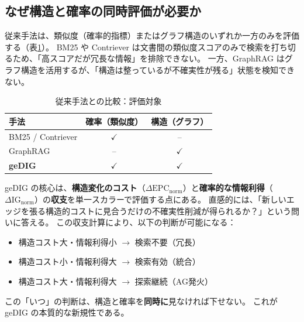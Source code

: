 \documentclass[ja=standard,xelatex]{bxjsarticle}
\newcommand{\gednorm}{\Delta\mathrm{EPC}_{\mathrm{norm}}}
\newcommand{\ignorm}{\Delta\mathrm{IG}_{\mathrm{norm}}}
\begin{document}
\subsection{なぜ構造と確率の同時評価が必要か}\label{sec:why_both}
従来手法は、類似度（確率的指標）またはグラフ構造のいずれか一方のみを評価する（表\ref{tab:structure_probability_comparison}）。
BM25 や Contriever は文書間の類似度スコアのみで検索を打ち切るため、「高スコアだが冗長な情報」を排除できない。
一方、GraphRAG はグラフ構造を活用するが、「構造は整っているが不確実性が残る」状態を検知できない。

\begin{table}[t]
\centering
\caption{従来手法との比較：評価対象}
\label{tab:structure_probability_comparison}
\small
\begin{tabular}{lcc}
\toprule
手法 & 確率（類似度） & 構造（グラフ） \\
\midrule
BM25 / Contriever & $\checkmark$ & -- \\
GraphRAG & -- & $\checkmark$ \\
\textbf{geDIG} & $\checkmark$ & $\checkmark$ \\
\bottomrule
\end{tabular}
\end{table}

geDIG の核心は、\textbf{構造変化のコスト}（$\gednorm$）と\textbf{確率的な情報利得}（$\ignorm$）の\textbf{収支}を単一スカラーで評価する点にある。
直感的には、「新しいエッジを張る構造的コストに見合うだけの不確実性削減が得られるか？」という問いに答える。
この収支計算により、以下の判断が可能になる：
\begin{itemize}[leftmargin=1.6em]
    \item 構造コスト大・情報利得小 $\to$ 検索不要（冗長）
    \item 構造コスト小・情報利得大 $\to$ 検索有効（統合）
    \item 構造コスト大・情報利得大 $\to$ 探索継続（AG発火）
\end{itemize}
この「いつ」の判断は、構造と確率を\textbf{同時に}見なければ下せない。
これが geDIG の本質的な新規性である。
\end{document}
